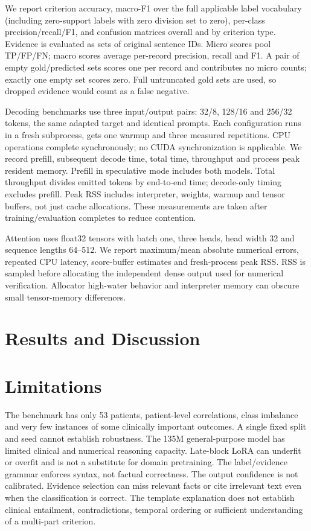 \documentclass[conference]{IEEEtran}
\begin{document}
We report criterion accuracy, macro-F1 over the full applicable label vocabulary (including zero-support labels with zero division set to zero), per-class precision/recall/F1, and confusion matrices overall and by criterion type. Evidence is evaluated as sets of original sentence IDs. Micro scores pool TP/FP/FN; macro scores average per-record precision, recall and F1. A pair of empty gold/predicted sets scores one per record and contributes no micro counts; exactly one empty set scores zero. Full untruncated gold sets are used, so dropped evidence would count as a false negative.

Decoding benchmarks use three input/output pairs: 32/8, 128/16 and 256/32 tokens, the same adapted target and identical prompts. Each configuration runs in a fresh subprocess, gets one warmup and three measured repetitions. CPU operations complete synchronously; no CUDA synchronization is applicable. We record prefill, subsequent decode time, total time, throughput and process peak resident memory. Prefill in speculative mode includes both models. Total throughput divides emitted tokens by end-to-end time; decode-only timing excludes prefill. Peak RSS includes interpreter, weights, warmup and tensor buffers, not just cache allocations. These measurements are taken after training/evaluation completes to reduce contention.

Attention uses float32 tensors with batch one, three heads, head width 32 and sequence lengths 64--512. We report maximum/mean absolute numerical errors, repeated CPU latency, score-buffer estimates and fresh-process peak RSS. RSS is sampled before allocating the independent dense output used for numerical verification. Allocator high-water behavior and interpreter memory can obscure small tensor-memory differences.

\section{Results and Discussion}

\FloatBarrier

\section{Limitations}
The benchmark has only 53 patients, patient-level correlations, class imbalance and very few instances of some clinically important outcomes. A single fixed split and seed cannot establish robustness. The 135M general-purpose model has limited clinical and numerical reasoning capacity. Late-block LoRA can underfit or overfit and is not a substitute for domain pretraining. The label/evidence grammar enforces syntax, not factual correctness. The output confidence is not calibrated. Evidence selection can miss relevant facts or cite irrelevant text even when the classification is correct. The template explanation does not establish clinical entailment, contradictions, temporal ordering or sufficient understanding of a multi-part criterion.
\end{document}
